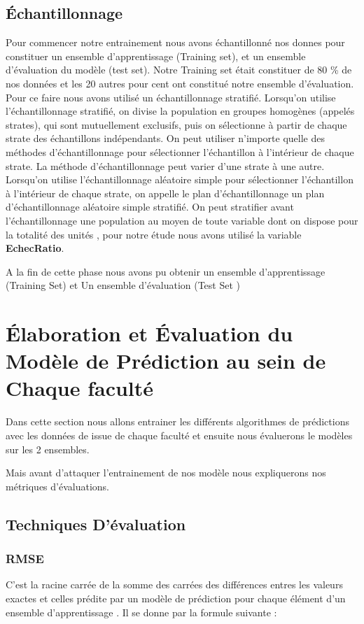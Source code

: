 \subsection{Échantillonnage  \cite{statBook1} } 
Pour commencer notre entrainement nous avons échantillonné nos donnes pour constituer un ensemble d'apprentissage (Training set), et un ensemble d'évaluation du modèle (test set). Notre Training set était constituer de 80 \% de nos données et les 20 autres pour cent ont constitué notre ensemble d'évaluation.
Pour ce faire nous avons utilisé un échantillonnage stratifié.
Lorsqu'on utilise l'échantillonnage stratifié, on divise la population en groupes homogènes (appelés strates), qui sont mutuellement exclusifs, puis on sélectionne à partir de chaque strate des échantillons indépendants. On peut utiliser n'importe quelle des méthodes d'échantillonnage  pour sélectionner l'échantillon à l'intérieur de chaque strate. La méthode d'échantillonnage peut varier d'une strate à une autre. Lorsqu'on utilise l'échantillonnage aléatoire simple pour sélectionner l'échantillon à l'intérieur de chaque strate, on appelle le plan d'échantillonnage un plan d'échantillonnage aléatoire simple stratifié. On peut stratifier avant l'échantillonnage une population au moyen de toute variable dont on dispose pour la totalité des unités , pour notre étude nous avons utilisé la variable \textbf{EchecRatio}.

A la fin de cette phase nous avons pu obtenir un ensemble d'apprentissage (Training Set) et Un ensemble d'évaluation (Test Set )

\section {Élaboration et Évaluation du Modèle de Prédiction au sein de Chaque faculté} 
Dans cette section nous allons entrainer les différents algorithmes de prédictions avec les données de issue de chaque faculté et ensuite nous évaluerons le modèles sur les 2 ensembles.

Mais avant d'attaquer l'entrainement de nos modèle nous expliquerons nos métriques d'évaluations.
\subsection{Techniques D'évaluation} 
\subsubsection{\ac{RMSE} \cite{ProbaStat} }
C'est la racine carrée de la somme des carrées des différences entres les valeurs exactes et celles prédite par un modèle de prédiction pour chaque élément d'un ensemble d'apprentissage .
Il se donne par la formule suivante  :

